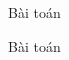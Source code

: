 \begin{frame}{Bài toán}

\begin{block}{Bài toán}

\end{block} 
 











\end{frame}


% 







